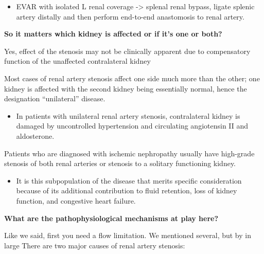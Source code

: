 \documentclass[
]{book}
\providecommand{\tightlist}{%
  \setlength{\itemsep}{0pt}\setlength{\parskip}{0pt}}
\begin{document}
\begin{itemize}
  \begin{itemize}
  \tightlist
  \item
    EVAR with isolated L renal coverage -\textgreater{} splenal renal bypass,
    ligate splenic artery distally and then perform end-to-end
    anastomosis to renal artery.
    \citep{benjamin126RenovascularDisease2019}
  \end{itemize}
\end{itemize}

\textbf{So it matters which kidney is affected or if it's one or both?}

Yes, effect of the stenosis may not be clinically apparent due to
compensatory function of the unaffected contralateral kidney

Most cases of renal artery stenosis affect one side much more than the
other; one kidney is affected with the second kidney being essentially
normal, hence the designation ``unilateral'' disease.

\begin{itemize}
\tightlist
\item
  In patients with unilateral renal artery stenosis, contralateral
  kidney is damaged by uncontrolled hypertension and circulating
  angiotensin II and aldosterone. \citep{rickey125RenovascularDisease2019}
\end{itemize}

Patients who are diagnosed with ischemic nephropathy usually have
high-grade stenosis of both renal arteries or stenosis to a solitary
functioning kidney.

\begin{itemize}
\tightlist
\item
  It is this subpopulation of the disease that merits specific
  consideration because of its additional contribution to fluid
  retention, loss of kidney function, and congestive heart failure.
\end{itemize}

\textbf{What are the pathophysiological mechanisms at play here?}

Like we said, first you need a flow limitation. We mentioned several,
but by in large There are two major causes of renal artery stenosis:
\end{document}
